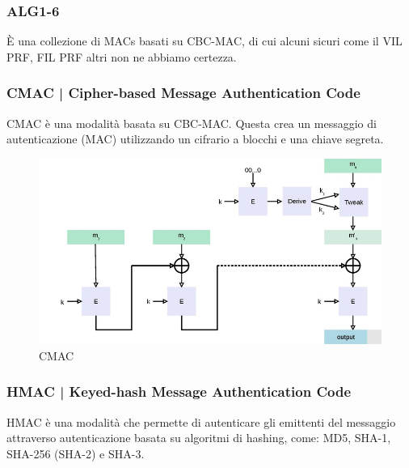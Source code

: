 \subsubsection{ALG1-6}

   

\textsf{\small È una collezione di MACs basati su CBC-MAC, di cui alcuni sicuri come il VIL PRF, FIL PRF altri non ne abbiamo certezza.}

\subsubsection{CMAC | Cipher-based Message Authentication Code}

 

\textsf{\small CMAC è una modalità basata su CBC-MAC. Questa crea un messaggio di autenticazione (MAC) utilizzando un cifrario a blocchi e una chiave segreta. }

\begin{figure}[H]
	\centering
	\includegraphics[width=.9\textwidth, height=.9\textheight, keepaspectratio]{./images/aes_modes/CMAC_-_Cipher-based_Message_Authentication_Code}
	\caption{CMAC}
	\label{fig:cmac}
\end{figure}

\subsubsection{HMAC | Keyed-hash Message Authentication Code}

        

\textsf{\small HMAC è una modalità che permette di autenticare gli emittenti del messaggio attraverso autenticazione basata su algoritmi di hashing, come: MD5, SHA-1, SHA-256 (SHA-2) e SHA-3.}

